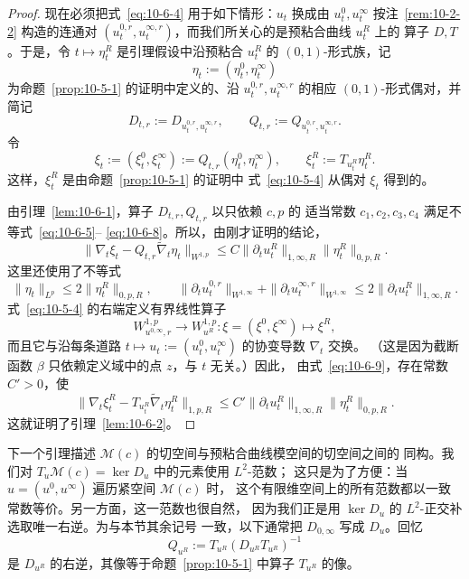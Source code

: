 \begin{proof}
现在必须把式~\eqref{eq:10-6-4} 用于如下情形：$u_t$ 换成由
$u_t^0,u_t^\infty$ 按注~\ref{rem:10-2-2} 构造的连通对
$(u_t^{0,r},u_t^{\infty,r})$，而我们所关心的是预粘合曲线 $u_t^R$ 上的
算子 $D,T$。于是，令 $t\mapsto\eta_t^R$ 是引理假设中沿预粘合
$u_t^R$ 的 $(0,1)$-形式族，记
\[
  \eta_t:=(\eta_t^0,\eta_t^\infty)
\]
为命题~\ref{prop:10-5-1} 的证明中定义的、沿
$u_t^{0,r},u_t^{\infty,r}$ 的相应 $(0,1)$-形式偶对，并简记
\[
  D_{t,r}:=D_{u_t^{0,r},u_t^{\infty,r}},
  \qquad
  Q_{t,r}:=Q_{u_t^{0,r},u_t^{\infty,r}}.
\]
令
\[
  \xi_t:=(\xi_t^0,\xi_t^\infty)
  :=Q_{t,r}(\eta_t^0,\eta_t^\infty),
  \qquad
  \xi_t^R:=T_{u_t^R}\eta_t^R.
\]
这样，$\xi_t^R$ 是由命题~\ref{prop:10-5-1} 的证明中
式~\eqref{eq:10-5-4} 从偶对 $\xi_t$ 得到的。

由引理~\ref{lem:10-6-1}，算子 $D_{t,r},Q_{t,r}$ 以只依赖 $c,p$ 的
适当常数 $c_1,c_2,c_3,c_4$ 满足不等式~\eqref{eq:10-6-5}--
\eqref{eq:10-6-8}。所以，由刚才证明的结论，
\begin{equation}\label{eq:10-6-9}
  \|\nabla_t\xi_t-Q_{t,r}\widetilde\nabla_t\eta_t\|_{W^{1,p}}
  \le C\|\partial_tu_t^R\|_{1,\infty,R}
         \|\eta_t^R\|_{0,p,R}.
\end{equation}
这里还使用了不等式
\[
  \|\eta_t\|_{L^p}\le2\|\eta_t^R\|_{0,p,R},
  \qquad
  \|\partial_tu_t^{0,r}\|_{W^{1,\infty}}
  +\|\partial_tu_t^{\infty,r}\|_{W^{1,\infty}}
  \le2\|\partial_tu_t^R\|_{1,\infty,R}.
\]
式~\eqref{eq:10-5-4} 的右端定义有界线性算子
\[
  W_{u^{0,\infty},r}^{1,p}\longrightarrow W_{u^R}^{1,p}:
  \xi=(\xi^0,\xi^\infty)\longmapsto\xi^R,
\]
而且它与沿每条道路
$t\mapsto u_t:=(u_t^0,u_t^\infty)$ 的协变导数 $\nabla_t$ 交换。
（这是因为截断函数 $\beta$ 只依赖定义域中的点 $z$，与 $t$ 无关。）因此，
由式~\eqref{eq:10-6-9}，存在常数 $C'>0$，使
\[
  \|\nabla_t\xi_t^R-T_{u_t^R}\widetilde\nabla_t\eta_t^R\|_{1,p,R}
  \le C'\|\partial_tu_t^R\|_{1,\infty,R}
          \|\eta_t^R\|_{0,p,R}.
\]
这就证明了引理~\ref{lem:10-6-2}。
\end{proof}

下一个引理描述 $\mathcal M(c)$ 的切空间与预粘合曲线模空间的切空间之间的
同构。我们对 $T_u\mathcal M(c)=\ker D_u$ 中的元素使用 $L^2$-范数；
这只是为了方便：当 $u=(u^0,u^\infty)$ 遍历紧空间 $\mathcal M(c)$ 时，
这个有限维空间上的所有范数都以一致常数等价。另一方面，这一范数也很自然，
因为我们正是用 $\ker D_u$ 的 $L^2$-正交补选取唯一右逆。为与本节其余记号
一致，以下通常把 $D_{0,\infty}$ 写成 $D_u$。回忆
\[
  Q_{u^R}:=T_{u^R}(D_{u^R}T_{u^R})^{-1}
\]
是 $D_{u^R}$ 的右逆，其像等于命题~\ref{prop:10-5-1} 中算子
$T_{u^R}$ 的像。

